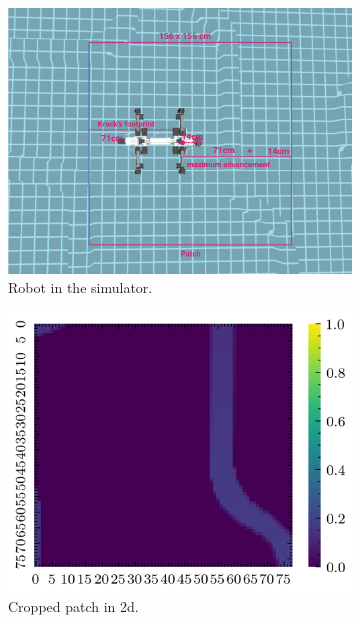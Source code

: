\documentclass[../document.tex]{subfiles}
\begin{document}
\begin{figure}[htbp]
    \centering
    \begin{subfigure}[b]{0.66\textwidth}
        \includegraphics[width=\textwidth]{../img/3/crop/crop.png}
        \caption{Robot in the simulator.}
    \end{subfigure}
    \begin{subfigure}[b]{0.45\textwidth}
        \includegraphics[width=\textwidth]{../img/3/crop/test-1-2d.png}
        \caption{Cropped patch in 2d.}
    \end{subfigure}
    \begin{subfigure}[b]{0.45\textwidth}

\end{subfigure}
\end{figure}
\end{document}
